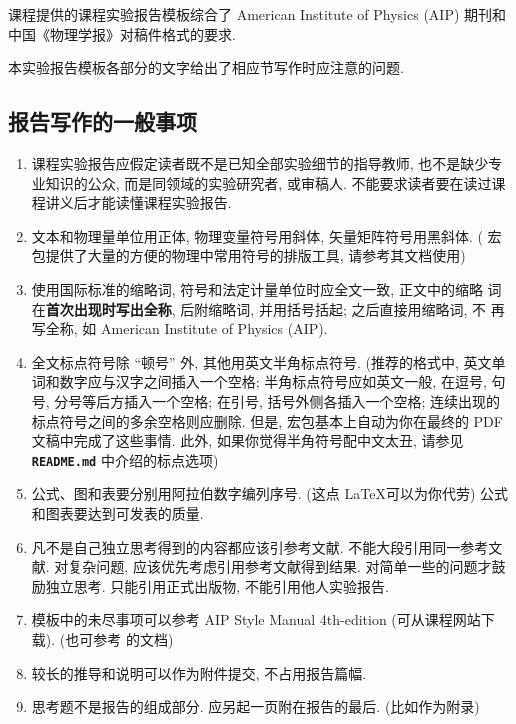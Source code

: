 \documentclass[font=fandol]{mpltx}
\newcommand{\note}[1]{{\color{gray}#1}}
\newcommand*\file[1]{\textbf{\texttt{#1}}}
\begin{document}
课程提供的课程实验报告模板综合了 American Institute of Physics (AIP) 期刊和中国《物理学报》对稿件格式的要求.

本实验报告模板各部分的文字给出了相应节写作时应注意的问题.

\subsection*{报告写作的一般事项}

\begin{enumerate}
	\item 课程实验报告应假定读者既不是已知全部实验细节的指导教师, 也不是缺少专业知识的公众, 而是同领域的实验研究者, 或审稿人.
	      不能要求读者要在读过课程讲义后才能读懂课程实验报告.
	\item 文本和物理量单位用正体, 物理变量符号用斜体, 矢量矩阵符号用黑斜体.
	      \note{( 宏包提供了大量的方便的物理中常用符号的排版工具, 请参考其文档使用)}
	\item 使用国际标准的缩略词, 符号和法定计量单位时应全文一致, 正文中的缩略
	      词在\textbf{首次出现时写出全称}, 后附缩略词, 并用括号括起; 之后直接用缩略词, 不
	      再写全称, 如 American Institute of Physics (AIP).
	\item 全文标点符号除 ``顿号'' 外, 其他用英文半角标点符号.
	      \note{(推荐的格式中, 英文单词和数字应与汉字之间插入一个空格;
		      半角标点符号应如英文一般, 在逗号, 句号, 分号等后方插入一个空格;
		      在引号, 括号外侧各插入一个空格;
		      连续出现的标点符号之间的多余空格则应删除.
		      但是, \pkg{xeCJK} 宏包基本上自动为你在最终的 PDF 文稿中完成了这些事情.
		      此外, 如果你觉得半角符号配中文太丑, 请参见 \file{README.md} 中介绍的标点选项)}
	\item 公式、图和表要分别用阿拉伯数字编列序号. \note{(这点 \LaTeX 可以为你代劳)}
	      公式和图表要达到可发表的质量.
	\item 凡不是自己独立思考得到的内容都应该引参考文献.
	      不能大段引用同一参考文献.
	      对复杂问题, 应该优先考虑引用参考文献得到结果.
	      对简单一些的问题才鼓励独立思考.
	      只能引用正式出版物, 不能引用他人实验报告.
	\item 模板中的未尽事项可以参考 AIP Style Manual 4th-edition (可从课程网站下载).
	      \note{(也可参考  的文档)}
	\item 较长的推导和说明可以作为附件提交, 不占用报告篇幅.
	\item 思考题不是报告的组成部分.
	      应另起一页附在报告的最后. \note{(比如作为附录)}
\end{enumerate}
\end{document}
